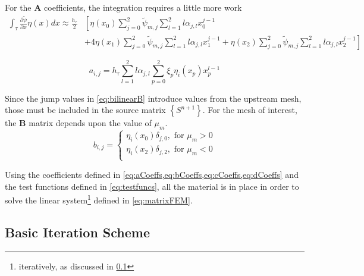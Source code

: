 \documentclass{article}
\newcommand{\pdiff}[2]{\frac{\partial#1}{\partial#2}}
\newcommand{\ddx}[1]{\pdiff{#1}{x}}
\newcommand{\fepsi}{\tilde{\psi}}
\newcommand{\fepsimj}{\fepsi_{m,j}}
\newcommand{\ajl}{\alpha_{j,l}}
\newcommand{\asMatrix}[1]{\mathbf{#1}}
\newcommand{\asVector}[1]{\left\lbrace#1\right\rbrace}
\begin{document}
For the $\asMatrix{A}$ coefficients, the integration requires a little more work
\begin{equation}
    \begin{split}
        \int_\tau\ddx{\fepsi}\eta(x)dx \approx \frac{h_\tau}{2}&\left[
            \eta(x_0)\sum_{j=0}^2\fepsimj\sum_{l=1}^2l\ajl x^{j-1}_0\right. \\
            & \left. +4\eta(x_1)\sum_{j=0}^2\fepsimj\sum_{l=1}^2l\ajl x^{j-1}_1
            +\eta(x_2)\sum_{j=0}^2\fepsimj\sum_{l=1}^2l\ajl x^{j-1}_2
        \right]
    \end{split}
\end{equation}

\begin{equation}
    \label{eq:aCoeffs}
    a_{i,j} = h_\tau\sum_{l=1}^2l\ajl\sum_{p=0}^2\xi_p\eta_i(x_p)x_p^{l-1}
\end{equation}

Since the jump values in \cref{eq:bilinearB} introduce values from the upstream mesh, 
those must be included in the source matrix $\asVector{S^{n+1}}$. 
For the mesh of interest, the $\asMatrix{B}$ matrix depends upon the value of $\mu_m$.
\begin{equation}
    \label{eq:bCoeffs}
    b_{i,j} = \begin{cases}
        \eta_i(x_0)\delta_{j,0},\text{ for }\mu_m > 0 \\
        \eta_i(x_2)\delta_{j,2},\text{ for }\mu_m < 0 \\
    \end{cases}
\end{equation}

Using the coefficients defined in \cref{eq:aCoeffs,eq:bCoeffs,eq:cCoeffs,eq:dCoeffs} and 
the test functions defined in \cref{eq:testfuncs}, all the material is in place in order
to solve the linear system\footnote{iteratively, as discussed in \cref{sec:iterations}}
defined in \cref{eq:matrixFEM}.
\subsection{Basic Iteration Scheme} \label{sec:iterations}
\end{document}
